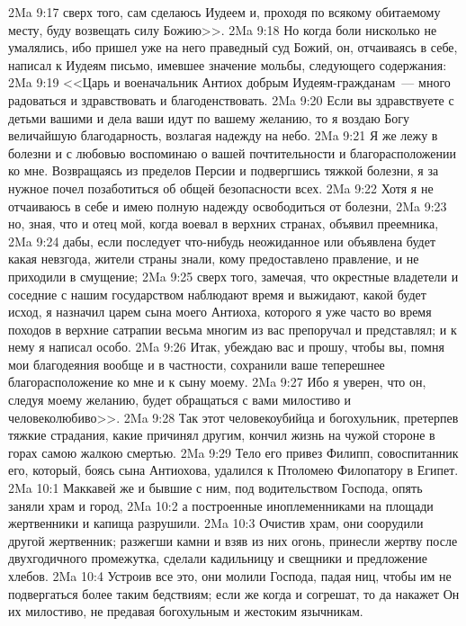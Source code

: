 \vs 2Ma 9:17 сверх того, сам сделаюсь Иудеем и, проходя по всякому обитаемому месту, буду возвещать силу Божию>>.
\vs 2Ma 9:18 Но когда боли нисколько не умалялись, ибо пришел уже на него праведный суд Божий, он, отчаиваясь в себе, написал к Иудеям письмо, имевшее значение мольбы, следующего содержания:
\vs 2Ma 9:19 <<Царь и военачальник Антиох добрым Иудеям-гражданам~--- много радоваться и здравствовать и благоденствовать.
\vs 2Ma 9:20 Если вы здравствуете с детьми вашими и дела ваши идут по вашему желанию, то я воздаю Богу величайшую благодарность, возлагая надежду на небо.
\vs 2Ma 9:21 Я же лежу в болезни и с любовью воспоминаю о вашей почтительности и благорасположении ко мне. Возвращаясь из пределов Персии и подвергшись тяжкой болезни, я за нужное почел позаботиться об общей безопасности всех.
\vs 2Ma 9:22 Хотя я не отчаиваюсь в себе и имею полную надежду освободиться от болезни,
\vs 2Ma 9:23 но, зная, что и отец мой, когда воевал в верхних странах, объявил преемника,
\vs 2Ma 9:24 дабы, если последует что-нибудь неожиданное или объявлена будет какая невзгода, жители страны знали, кому предоставлено правление, и не приходили в смущение;
\vs 2Ma 9:25 сверх того, замечая, что окрестные владетели и соседние с нашим государством наблюдают время и выжидают, какой будет исход, я назначил царем сына моего Антиоха, которого я уже часто во время походов в верхние сатрапии весьма многим из вас препоручал и представлял; и к нему я написал особо.
\vs 2Ma 9:26 Итак, убеждаю вас и прошу, чтобы вы, помня мои благодеяния вообще и в частности, сохранили ваше теперешнее благорасположение ко мне и к сыну моему.
\vs 2Ma 9:27 Ибо я уверен, что он, следуя моему желанию, будет обращаться с вами милостиво и человеколюбиво>>.
\rsbpar\vs 2Ma 9:28 Так этот человекоубийца и богохульник, претерпев тяжкие страдания, какие причинял другим, кончил жизнь на чужой стороне в горах самою жалкою смертью.
\vs 2Ma 9:29 Тело его привез Филипп, совоспитанник его, который, боясь сына Антиохова, удалился к Птоломею Филопатору в Египет.
\vs 2Ma 10:1 Маккавей же и бывшие с ним, под водительством Господа, опять заняли храм и город,
\vs 2Ma 10:2 а построенные иноплеменниками на площади жертвенники и капища разрушили.
\vs 2Ma 10:3 Очистив храм, они соорудили другой жертвенник; разжегши камни и взяв из них огонь, принесли жертву после двухгодичного промежутка, сделали кадильницу и свещники и предложение хлебов.
\vs 2Ma 10:4 Устроив все это, они молили Господа, падая ниц, чтобы им не подвергаться более таким бедствиям; если же когда и согрешат, то да накажет Он их милостиво, не предавая богохульным и жестоким язычникам.
